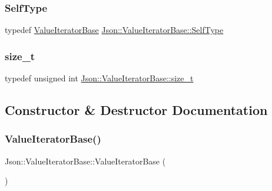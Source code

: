 \subsubsection{\texorpdfstring{Self\+Type}{SelfType}}
{\footnotesize\ttfamily typedef \hyperlink{classJson_1_1ValueIteratorBase}{Value\+Iterator\+Base} \hyperlink{classJson_1_1ValueIteratorBase_a9d2a940d03ea06d20d972f41a89149ee_a9d2a940d03ea06d20d972f41a89149ee}{Json\+::\+Value\+Iterator\+Base\+::\+Self\+Type}}

\mbox{\label{classJson_1_1ValueIteratorBase_a9d3a3c7ce5cdefe23cb486239cf07bb5_a9d3a3c7ce5cdefe23cb486239cf07bb5}} 
\subsubsection{\texorpdfstring{size\+\_\+t}{size\_t}}
{\footnotesize\ttfamily typedef unsigned int \hyperlink{classJson_1_1ValueIteratorBase_a9d3a3c7ce5cdefe23cb486239cf07bb5_a9d3a3c7ce5cdefe23cb486239cf07bb5}{Json\+::\+Value\+Iterator\+Base\+::size\+\_\+t}}



\subsection{Constructor \& Destructor Documentation}
\mbox{\label{classJson_1_1ValueIteratorBase_af45b028d9ff9cbd2554a87878b42dd75_af45b028d9ff9cbd2554a87878b42dd75}} 
\subsubsection{\texorpdfstring{Value\+Iterator\+Base()}{ValueIteratorBase()}\hspace{0.1cm}{\footnotesize\ttfamily [1/2]}}
{\footnotesize\ttfamily Json\+::\+Value\+Iterator\+Base\+::\+Value\+Iterator\+Base (\begin{DoxyParamCaption}{ }\end{DoxyParamCaption})}

